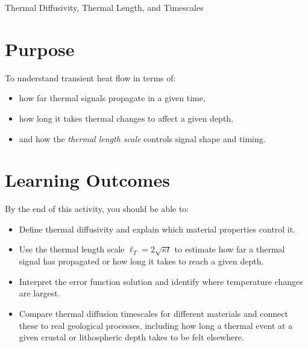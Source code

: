 \begin{activity}{Thermal Diffusivity, Thermal Length, and Timescales}

\section*{Purpose}
To understand transient heat flow in terms of:
\begin{itemize}
  \item how far thermal signals propagate in a given time,
  \item how long it takes thermal changes to affect a given depth,
  \item and how the \emph{thermal length scale} controls signal shape and timing.
\end{itemize}

\section*{Learning Outcomes}

By the end of this activity, you should be able to:
\begin{itemize}
  \item Define thermal diffusivity and explain which material properties control it.
  \item Use the thermal length scale $\ell_T = 2\sqrt{\kappa t}$ to estimate how far a thermal signal has propagated or how long it takes to reach a given depth.
  \item Interpret the error function solution and identify where temperature changes are largest.
  \item Compare thermal diffusion timescales for different materials and connect these to real geological processes, including how long a thermal event at a given crustal or lithospheric depth takes to be felt elsewhere.
\end{itemize}

\end{activity}
